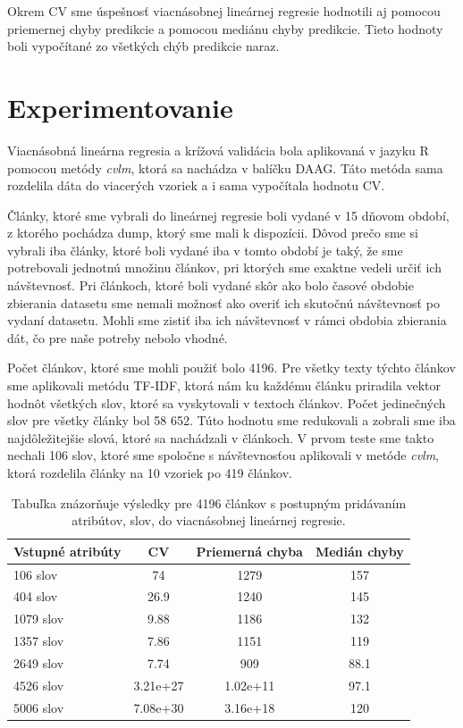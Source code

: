\documentclass[runningheads,a4paper]{llncs}
\begin{document}
Okrem CV sme úspešnosť viacnásobnej lineárnej regresie hodnotili aj pomocou priemernej chyby predikcie a pomocou mediánu chyby predikcie. Tieto hodnoty boli vypočítané zo všetkých chýb predikcie naraz.

\section{Experimentovanie}
Viacnásobná lineárna regresia a krížová validácia bola aplikovaná v jazyku R pomocou metódy {\em cvlm}, ktorá sa nachádza v balíčku DAAG. Táto metóda sama rozdelila dáta do viacerých vzoriek a i sama vypočítala hodnotu CV. 

Články, ktoré sme vybrali do lineárnej regresie boli vydané v 15 dňovom období, z ktorého pochádza dump, ktorý sme mali k dispozícii. Dôvod prečo sme si vybrali iba články, ktoré boli vydané iba v tomto období je taký, že sme potrebovali jednotnú množinu článkov, pri ktorých sme exaktne vedeli určiť ich návštevnosť. Pri článkoch, ktoré boli vydané skôr ako bolo časové obdobie zbierania datasetu sme nemali možnosť ako overiť ich skutočnú návštevnosť po vydaní datasetu. Mohli sme zistiť iba ich návštevnosť v rámci obdobia zbierania dát, čo pre naše potreby nebolo vhodné.

Počet článkov, ktoré sme mohli použiť bolo 4196. Pre všetky texty týchto článkov sme aplikovali metódu TF-IDF, ktorá nám ku každému článku priradila vektor hodnôt všetkých slov, ktoré sa vyskytovali v textoch článkov. Počet jedinečných slov pre všetky články bol 58 652. Túto hodnotu sme redukovali a zobrali sme iba najdôležitejšie slová, ktoré sa nachádzali v článkoch. V prvom teste sme takto nechali 106 slov, ktoré sme spoločne s návštevnosťou aplikovali v metóde {\em cvlm}, ktorá rozdelila články na 10 vzoriek po 419 článkov. 

\begin{table}
\begin{center}
	\begin{tabular}{|l|c|c|c|}
	\hline
	Vstupné atribúty & CV & Priemerná chyba & Medián chyby \\ \hline \hline
	106 slov & 74 & 1279 & 157 \\ \hline
	404 slov & 26.9 & 1240 & 145 \\ \hline
	1079 slov & 9.88 & 1186 & 132 \\ \hline
	1357 slov & 7.86 & 1151 & 119 \\ \hline
	2649 slov & 7.74 & 909 & 88.1 \\ \hline
	4526 slov & 3.21e+27 & 1.02e+11 & 97.1 \\ \hline
	5006 slov & 7.08e+30 & 3.16e+18 & 120 \\ \hline
	\end{tabular}
\end{center}
\caption{Tabuľka znázorňuje výsledky pre 4196 článkov s postupným pridávaním atribútov, slov, do viacnásobnej lineárnej regresie. }
\end{table}
\end{document}
